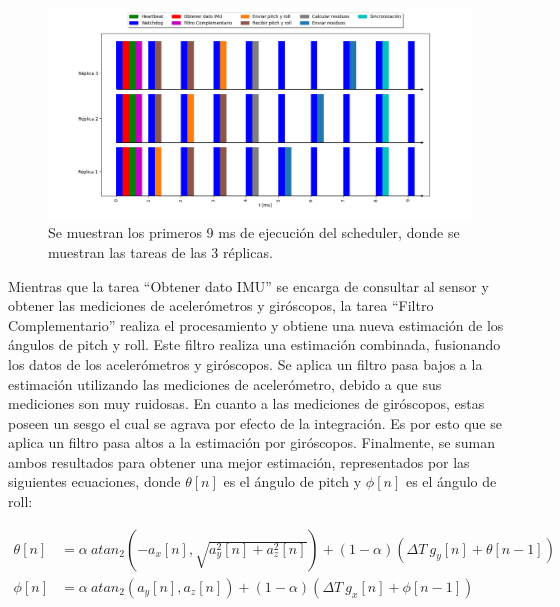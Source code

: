 \begin{figure}[!t]
    \centering
    \includegraphics[width=\textwidth]{img/grafico_hyperperiod_pruebas_realizadas.png}
    \caption{Se muestran los primeros 9 ms de ejecución del scheduler, donde se muestran las tareas de las 3 réplicas.}
    \label{fig:grafico_hyperperiod_pruebas_realizadas}
\end{figure}



Mientras que la tarea ``Obtener dato IMU'' se encarga de consultar al sensor y obtener las mediciones de acelerómetros y giróscopos, la tarea ``Filtro Complementario'' realiza el procesamiento y obtiene una nueva estimación de los ángulos de pitch y roll. Este filtro realiza una estimación combinada, fusionando los datos de los acelerómetros y giróscopos. Se aplica un filtro pasa bajos a la estimación utilizando las mediciones de acelerómetro, debido a que sus mediciones son muy ruidosas. En cuanto a las mediciones de giróscopos, estas poseen un sesgo el cual se agrava por efecto de la integración. Es por esto que se aplica un filtro pasa altos a la estimación por giróscopos. Finalmente, se suman ambos resultados para obtener una mejor estimación, representados por las siguientes ecuaciones, donde $\theta[n]$ es el ángulo de pitch y $\phi[n]$ es el ángulo de roll:

\begin{subequations}
    \begin{align}
        \theta[n] &= \alpha \ atan_2(-a_x[n], \sqrt{a_y^2[n] + a_z^2[n]}) + (1 - \alpha) \left( \Delta T \ g_y[n] + \theta[n-1] \right)\\
        \phi[n] &= \alpha \ atan_2(a_y[n], a_z[n]) + (1 - \alpha) \left( \Delta T \ g_x[n] + \phi [n-1] \right)
    \end{align}
\end{subequations}

